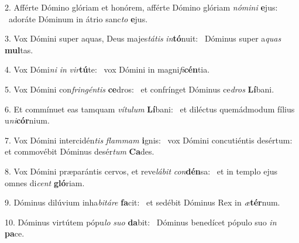 2. Afférte Dómino glóriam et honórem, afférte Dómino glóriam \textit{nó}\textit{mi}\textit{ni} \textbf{e}jus: \ast\  adoráte Dóminum in átrio sanc\textit{to} \textbf{e}jus.\

3. Vox Dómini super aquas, Deus majes\textit{tá}\textit{tis} \textit{in}\textbf{tó}nuit: \ast\  Dóminus super a\textit{quas} \textbf{mul}tas.\

4. Vox Dómi\textit{ni} \textit{in} \textit{vir}\textbf{tú}te: \ast\  vox Dómini in magni\textit{fi}\textbf{cén}tia.\

5. Vox Dómini con\textit{frin}\textit{gén}\textit{tis} \textbf{ce}dros: \ast\  et confrínget Dóminus ce\textit{dros} \textbf{Lí}bani.\

6. Et commínuet eas tamquam \textit{ví}\textit{tu}\textit{lum} \textbf{Lí}bani: \ast\  et diléctus quemádmodum fílius u\textit{ni}\textbf{cór}nium.\

7. Vox Dómini intercidén\textit{tis} \textit{flam}\textit{mam} \textbf{i}gnis: \ast\  vox Dómini concutiéntis desértum: et commovébit Dóminus desér\textit{tum} \textbf{Ca}des.\

8. Vox Dómini præparántis cervos, et reve\textit{lá}\textit{bit} \textit{con}\textbf{dén}sa: \ast\  et in templo ejus omnes di\textit{cent} \textbf{gló}riam.\

9. Dóminus dilúvium inha\textit{bi}\textit{tá}\textit{re} \textbf{fa}cit: \ast\  et sedébit Dóminus Rex in \textit{æ}\textbf{tér}num.\

10. Dóminus virtútem pópu\textit{lo} \textit{su}\textit{o} \textbf{da}bit: \ast\  Dóminus benedícet pópulo suo \textit{in} \textbf{pa}ce.\

